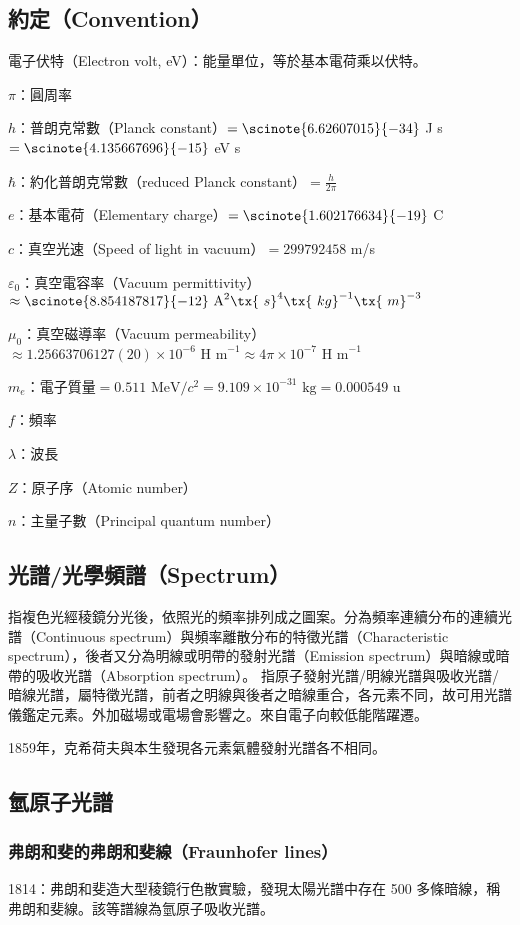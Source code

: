 \documentclass[a4paper,12pt]{report}
\begin{document}
\subsection{約定（Convention）}
\bit
\item 電子伏特（Electron volt, eV）：能量單位，等於基本電荷乘以伏特。
\item $\pi$：圓周率
\item $h$：普朗克常數（Planck constant）$=\scinote{6.62607015}{-34}$ J s $=\scinote{4.135667696}{-15}$ eV s
\item $\hbar$：約化普朗克常數（reduced Planck constant）$=\frac{h}{2\pi}$
\item $e$：基本電荷（Elementary charge）$=\scinote{1.602176634}{-19}$ C
\item $c$：真空光速（Speed of light in vacuum）$=299792458$ m/s
\item $\varepsilon_0$：真空電容率（Vacuum permittivity）$\approx\scinote{8.854187817}{-12}\text{\ A}^2\tx{\ s}^4\tx{\ kg}^{-1}\tx{\ m}^{-3}$
\item $\mu_0$：真空磁導率（Vacuum permeability）$\approx 1.25663706127(20)\times 10^{-6}\text{\ H m}^{-1}\approx 4\pi\times 10^{-7} \text{\ H m}^{-1}$
\item $m_e$：電子質量$=0.511\text{\ MeV/}c^2=9.109\times 10^{-31}\text{\ kg}=0.000549\text{\ u}$
\item $f$：頻率
\item $\lambda$：波長
\item $Z$：原子序（Atomic number）
\item $n$：主量子數（Principal quantum number）
\eit
\subsection{光譜/光學頻譜（Spectrum）}
指複色光經稜鏡分光後，依照光的頻率排列成之圖案。分為頻率連續分布的連續光譜（Continuous spectrum）與頻率離散分布的特徵光譜（Characteristic spectrum），後者又分為明線或明帶的發射光譜（Emission spectrum）與暗線或暗帶的吸收光譜（Absorption spectrum）。
指原子發射光譜/明線光譜與吸收光譜/暗線光譜，屬特徵光譜，前者之明線與後者之暗線重合，各元素不同，故可用光譜儀鑑定元素。外加磁場或電場會影響之。來自電子向較低能階躍遷。

1859年，克希荷夫與本生發現各元素氣體發射光譜各不相同。
\subsection{氫原子光譜}
\subsubsection{弗朗和斐的弗朗和斐線（Fraunhofer lines）}
1814：弗朗和斐造大型稜鏡行色散實驗，發現太陽光譜中存在 500 多條暗線，稱弗朗和斐線。該等譜線為氫原子吸收光譜。
\end{document}
